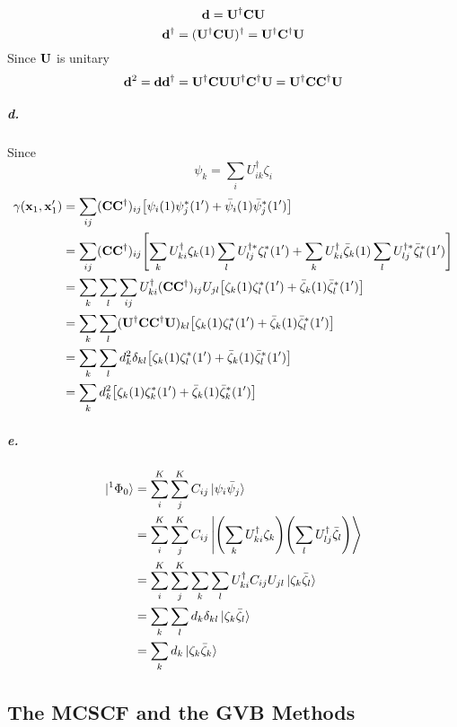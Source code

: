 \documentclass[a4paper]{article}
\newcommand{\subex}[1]{\subparagraph{#1}}
\numberwithin{equation}{subsection}
\begin{document}
\begin{equation}\label{key}
\vb{d} = \vb{U}^\dagger\vb{C}\vb{U} 
\end{equation}
\begin{equation}\label{key}
\vb{d}^\dagger = (\vb{U}^\dagger\vb{C}\vb{U} )^\dagger = \vb{U}^\dagger\vb{C}^\dagger\vb{U} 
\end{equation}
Since $ \vb{U} $ is unitary
\begin{equation}\label{key}
\vb{d}^2 = \vb{d}\vb{d}^\dagger = \vb{U}^\dagger\vb{C}\vb{U} \vb{U}^\dagger\vb{C}^\dagger\vb{U} = \vb{U}^\dagger\vb{C}\vb{C}^\dagger\vb{U}
\end{equation}
\subex{d.}
Since
\begin{equation}\label{key}
\psi_k = \sum_i U^\dagger_{ik} \zeta_i
\end{equation}
\begin{align}
\gamma(\vb{x}_1,\vb{x}'_1) &= \sum_{ij} (\vb{C}\vb{C}^\dagger)_{ij} \qty[\psi_i(1)\psi_j^*(1') 
+ \bar\psi_i(1)\bar\psi_j^*(1')] \notag\\
&=  \sum_{ij} (\vb{C}\vb{C}^\dagger)_{ij} \qty[\sum_k U^\dagger_{ki}\zeta_k(1)\sum_l U^{\dagger*}_{lj}\zeta_l^*(1')
+ \sum_k U^\dagger_{ki}\bar\zeta_k(1)\sum_l U^{\dagger*}_{lj}\bar\zeta_l^*(1')] \notag\\
&=  \sum_k\sum_l \sum_{ij} U^\dagger_{ki} (\vb{C}\vb{C}^\dagger)_{ij} U_{jl} \qty[\zeta_k(1) \zeta_l^*(1')
+ \bar\zeta_k(1)\bar\zeta_l^*(1')] \notag\\
&=  \sum_k\sum_l (\vb{U}^\dagger \vb{C}\vb{C}^\dagger \vb{U})_{kl} \qty[\zeta_k(1) \zeta_l^*(1')
+ \bar\zeta_k(1)\bar\zeta_l^*(1')] \notag\\
&=  \sum_k\sum_l d^2_k \delta_{kl} \qty[\zeta_k(1) \zeta_l^*(1')
+ \bar\zeta_k(1)\bar\zeta_l^*(1')] \notag\\
&= \sum_k d^2_k \qty[\zeta_k(1) \zeta_k^*(1')
+ \bar\zeta_k(1) \bar\zeta_k^*(1')] 
\end{align}
\subex{e.}
\begin{align}
\ket{^1\Phi_0} &= \sum_i^K \sum_j^K C_{ij} \ket{\psi_i\bar\psi_j} \notag\\
&= \sum_i^K \sum_j^K C_{ij} \Ket{ \qty(\sum_k U^\dagger_{ki} \zeta_k)\qty(\sum_l U^\dagger_{lj} \bar\zeta_l)} \notag\\
&= \sum_i^K \sum_j^K \sum_k\sum_l U^\dagger_{ki} C_{ij} U_{jl} \ket{ \zeta_k  \bar\zeta_l} \notag\\
&= \sum_k\sum_l d_{k}\delta_{kl} \ket{ \zeta_k  \bar\zeta_l} \notag\\
&= \sum_k d_{k} \ket{ \zeta_k  \bar\zeta_k}
\end{align}

\subsection{The MCSCF and the GVB Methods}
\end{document}
